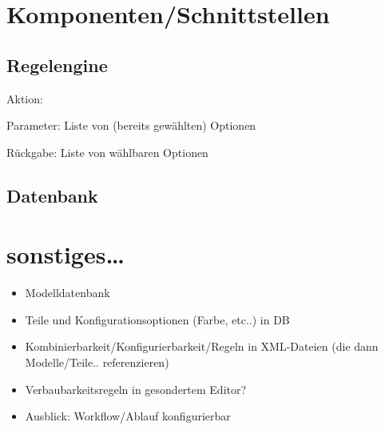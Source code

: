 \documentclass[a4paper,10pt]{article}
\begin{document}
\section{Komponenten/Schnittstellen}

\subsection*{Regelengine}

Aktion:
 

Parameter:
 Liste von (bereits gewählten) Optionen

Rückgabe:
 Liste von wählbaren Optionen

\subsection*{Datenbank}


\section{sonstiges\ldots}
\begin{itemize}
 \item Modelldatenbank
 \item Teile und Konfigurationsoptionen (Farbe, etc..) in DB
 \item Kombinierbarkeit/Konfigurierbarkeit/Regeln in XML-Dateien (die dann Modelle/Teile.. referenzieren)
 \item Verbaubarkeitsregeln in gesondertem Editor?
 \item Ausblick: Workflow/Ablauf konfigurierbar
\end{itemize}
\end{document}
